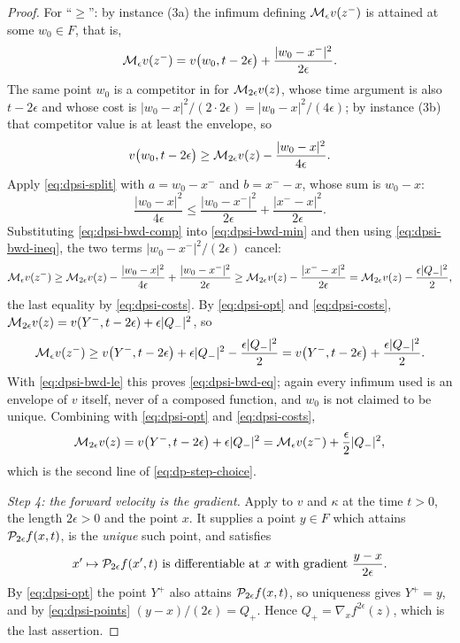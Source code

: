 \begin{proof}
For ``$\ge$'': by instance (3a) the infimum defining $\mathcal{M}_\epsilon v(z^-)$ is
attained at some $w_0\in F$, that is,
\begin{equation}\label{eq:dpsi-bwd-min}
  \mathcal{M}_\epsilon v(z^-)=v\bigl(w_0,t-2\epsilon\bigr)
    +\frac{|w_0-x^-|^2}{2\epsilon}.
\end{equation}
The same point $w_0$ is a competitor in  for
$\mathcal{M}_{2\epsilon}v(z)$, whose time argument is also $t-2\epsilon$ and whose
cost is $|w_0-x|^2/(2\cdot2\epsilon)=|w_0-x|^2/(4\epsilon)$; by instance (3b)
that competitor value is at least the envelope, so
\begin{equation}\label{eq:dpsi-bwd-comp}
  v\bigl(w_0,t-2\epsilon\bigr)\ge\mathcal{M}_{2\epsilon}v(z)
    -\frac{|w_0-x|^2}{4\epsilon}.
\end{equation}
Apply \eqref{eq:dpsi-split} with $a=w_0-x^-$ and $b=x^--x$, whose sum is
$w_0-x$:
\begin{equation}\label{eq:dpsi-bwd-ineq}
  \frac{|w_0-x|^2}{4\epsilon}\le\frac{|w_0-x^-|^2}{2\epsilon}
    +\frac{|x^--x|^2}{2\epsilon}.
\end{equation}
Substituting \eqref{eq:dpsi-bwd-comp} into \eqref{eq:dpsi-bwd-min} and then
using \eqref{eq:dpsi-bwd-ineq}, the two terms $|w_0-x^-|^2/(2\epsilon)$ cancel:
\[
  \mathcal{M}_\epsilon v(z^-)
   \ge\mathcal{M}_{2\epsilon}v(z)-\frac{|w_0-x|^2}{4\epsilon}
     +\frac{|w_0-x^-|^2}{2\epsilon}
   \ge\mathcal{M}_{2\epsilon}v(z)-\frac{|x^--x|^2}{2\epsilon}
   =\mathcal{M}_{2\epsilon}v(z)-\frac{\epsilon|Q_-|^2}{2},
\]
the last equality by \eqref{eq:dpsi-costs}. By \eqref{eq:dpsi-opt} and
\eqref{eq:dpsi-costs}, $\mathcal{M}_{2\epsilon}v(z)
=v(Y^-,t-2\epsilon)+\epsilon|Q_-|^2$, so
\[
  \mathcal{M}_\epsilon v(z^-)\ge v\bigl(Y^-,t-2\epsilon\bigr)+\epsilon|Q_-|^2
     -\frac{\epsilon|Q_-|^2}{2}
   =v\bigl(Y^-,t-2\epsilon\bigr)+\frac{\epsilon|Q_-|^2}{2}.
\]
With \eqref{eq:dpsi-bwd-le} this proves \eqref{eq:dpsi-bwd-eq}; again every
infimum used is an envelope of $v$ itself, never of a composed function, and
$w_0$ is not claimed to be unique. Combining with \eqref{eq:dpsi-opt} and
\eqref{eq:dpsi-costs},
\[
  \mathcal{M}_{2\epsilon}v(z)=v\bigl(Y^-,t-2\epsilon\bigr)+\epsilon|Q_-|^2
   =\mathcal{M}_\epsilon v(z^-)+\frac{\epsilon}{2}|Q_-|^2,
\]
which is the second line of \eqref{eq:dp-step-choice}.

\emph{Step 4: the forward velocity is the gradient.}
Apply  to $v$ and $\kappa$ at the time $t>0$, the
length $2\epsilon>0$ and the point $x$. It supplies a point $y\in F$ which
attains $\mathcal{P}_{2\epsilon}f(x,t)$, is the \emph{unique} such point, and
satisfies
\[
  \text{$x'\mapsto\mathcal{P}_{2\epsilon}f(x',t)$ is differentiable at $x$ with
  gradient }\frac{y-x}{2\epsilon}.
\]
By \eqref{eq:dpsi-opt} the point $Y^+$ also attains $\mathcal{P}_{2\epsilon}f(x,t)$,
so uniqueness gives $Y^+=y$, and by \eqref{eq:dpsi-points}
$(y-x)/(2\epsilon)=Q_+$. Hence
$Q_+=\nabla_xf^{2\epsilon}(z)$, which is the last assertion.
\end{proof}
